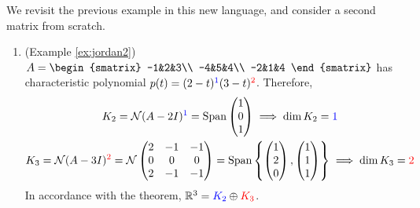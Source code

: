 \begin{examples}{}{}
	We revisit the previous example in this new language, and consider a second matrix from scratch.
	\begin{enumerate}
  	\item (Example \ref{ex:jordan2}) \ $A=
  	\begin{smatrix}
			-1&2&3\\
			-4&5&4\\
			-2&1&4
		\end{smatrix}$
		has characteristic polynomial $p(t)=(2-t)^{\textcolor{blue}{1}}(3-t)^{\textcolor{red}{2}}$. Therefore,
		\begin{gather*}
			K_2=\mathcal{N}(A-2I)^{\textcolor{blue}{1}}=\operatorname{Span}\begin{pmatrix}1\\0\\1\end{pmatrix}\implies\dim K_2={\textcolor{blue}{1}}\\
			K_3=\mathcal{N}(A-3I)^{\textcolor{red}{2}}=\mathcal{N}\begin{pmatrix}
			2&-1&-1\\0&0&0\\2&-1&-1
			\end{pmatrix} =\operatorname{Span}\left\{\begin{pmatrix}1\\2\\0\end{pmatrix},\begin{pmatrix}1\\1\\1\end{pmatrix}\right\}\implies\dim K_3={\textcolor{red}{2}}
		\end{gather*}
		In accordance with the theorem, $\mathbb{R}^3=\textcolor{blue}{K_2}\oplus \textcolor{red}{K_3}$.
	

\end{enumerate}
\end{examples}
